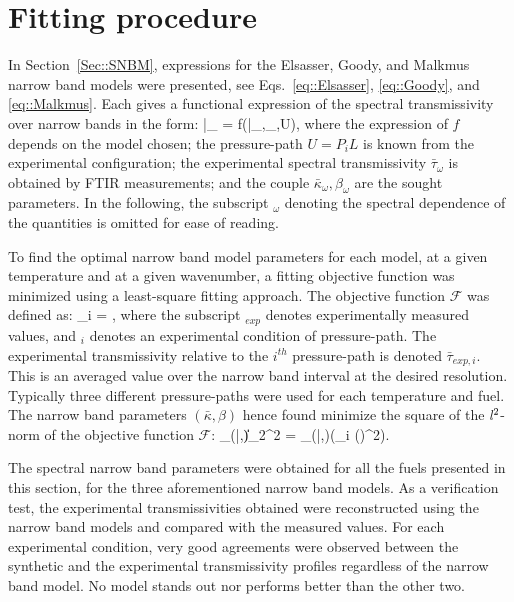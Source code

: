 \section{Fitting procedure}

In Section~\ref{Sec::SNBM}, expressions for the Elsasser, Goody, and Malkmus narrow band models were presented, see Eqs.~\ref{eq::Elsasser}, \ref{eq::Goody}, and \ref{eq::Malkmus}. Each gives a functional expression of the spectral transmissivity over narrow bands in the form:
\be
 \bar{\tau}_{\omega} = f(\bar{\kappa}_{\omega},\beta_{\omega},U),
\ee
where the expression of $f$ depends on the model chosen; the pressure-path $U =  P_i L$ is known from the experimental configuration; the experimental spectral transmissivity $\bar{\tau}_{\omega}$ is obtained by FTIR measurements; and the couple $\bar{\kappa}_{\omega},\beta_{\omega}$ are the sought parameters. In the following, the subscript $_\omega$ denoting the spectral dependence of the quantities is omitted for ease of reading.

To find the optimal narrow band model parameters for each model, at a given temperature and at a given wavenumber, a fitting objective function was minimized using a least-square fitting approach. The objective function $\mathcal{F}$ was defined as:
\be
 _i = ,
\ee
where the subscript $_{exp}$ denotes experimentally measured values, and $_i$ denotes an experimental condition of  pressure-path. The experimental transmissivity relative to the $i^{th}$ pressure-path is denoted $\bar{\tau}_{exp,i}$. This is an averaged value over the narrow band interval at the desired resolution. Typically three different pressure-paths were used for each temperature and fuel. The narrow band parameters $\left(\bar{\kappa},\beta\right)$ hence found minimize the square of the \textit{l}$\rm ^2$-norm of the objective function $\mathcal{F}$:
\be
 \min\limits_{\left(\bar{\kappa},\beta\right)}\|\|_2^2 = \min\limits_{\left(\bar{\kappa},\beta\right)}\left(\displaystyle\sum \limits_i \left(\right)^2\right).
\ee

The spectral narrow band parameters were obtained for all the fuels presented in this section, for the three aforementioned narrow band models. As a verification test, the experimental transmissivities obtained were reconstructed using the narrow band models and compared with the measured values. For each experimental condition, very good agreements were observed between the synthetic and the experimental transmissivity profiles regardless of the narrow band model. No model stands out nor performs better than the other two.

